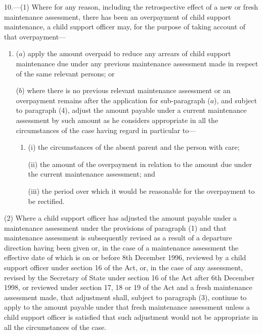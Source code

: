 \documentclass[12pt,a4paper]{article}
\begin{document}
10.—(1) Where for any reason, including the retrospective effect of a new or fresh maintenance assessment, there has been an overpayment of child support maintenance, a child support officer may, for the purpose of taking account of that overpayment—
\begin{enumerate}\item[]
($a$) apply the amount overpaid to reduce any arrears of child support maintenance due under any previous maintenance assessment made in respect of the same relevant persons; or

($b$) where there is no previous relevant maintenance assessment or an overpayment remains after the application for sub-paragraph ($a$), and subject to paragraph (4), adjust the amount payable under a current maintenance assessment by such amount as he considers appropriate in all the circumstances of the case having regard in particular to—
\begin{enumerate}\item[]
(i) the circumstances of the absent parent and the person with care;

\begin{sloppypar}
(ii) the amount of the overpayment in relation to the amount due under the current maintenance assessment; and
\end{sloppypar}

(iii) the period over which it would be reasonable for the overpayment to be rectified.
\end{enumerate}
\end{enumerate}

(2) Where a child support officer has adjusted the amount payable under a maintenance assessment under the provisions of paragraph (1) and that maintenance assessment is subsequently 
revised as a result of a departure direction having been given or,  %
in the case of a maintenance assessment the effective date of which is on or before 8th December 1996, reviewed by a child support officer under section 16 of the Act, or, in the case of any assessment, revised by the Secretary of State under section 16 of the Act after 6th December 1998, or reviewed under section  %
17, 18 or 19 of the Act and a fresh maintenance assessment made, that adjustment shall, subject to paragraph (3), continue to apply to the amount payable under that fresh maintenance assessment unless a child support officer is satisfied that such adjustment would not be appropriate in all the circumstances of the case.
\end{document}

